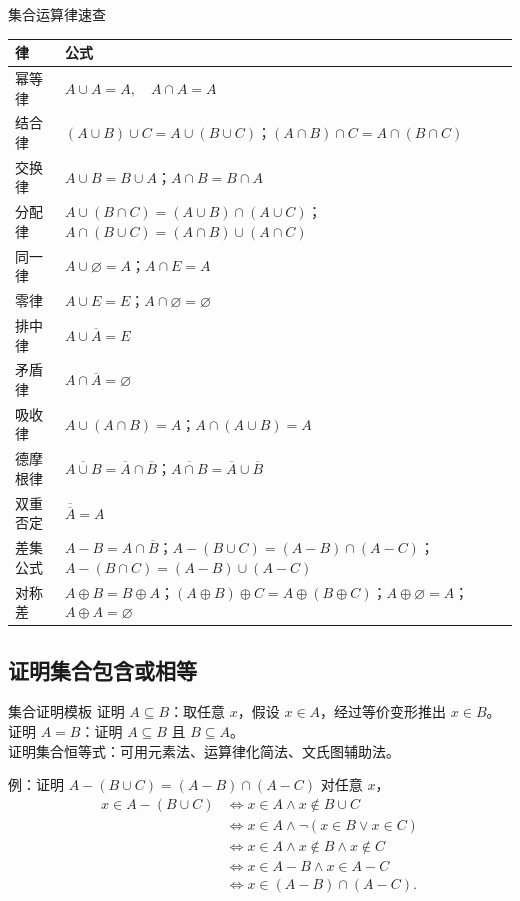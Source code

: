 \documentclass[UTF8,zihao=-4]{ctexart}
\begin{document}
\begin{corebox}{集合运算律速查}
\begin{longtable}{p{2.6cm}p{11cm}}
\toprule
律 & 公式 \\
\midrule
幂等律 & $A\cup A=A,\quad A\cap A=A$ \\
结合律 & $(A\cup B)\cup C=A\cup(B\cup C)$；$(A\cap B)\cap C=A\cap(B\cap C)$ \\
交换律 & $A\cup B=B\cup A$；$A\cap B=B\cap A$ \\
分配律 & $A\cup(B\cap C)=(A\cup B)\cap(A\cup C)$；$A\cap(B\cup C)=(A\cap B)\cup(A\cap C)$ \\
同一律 & $A\cup\varnothing=A$；$A\cap E=A$ \\
零律 & $A\cup E=E$；$A\cap\varnothing=\varnothing$ \\
排中律 & $A\cup\overline A=E$ \\
矛盾律 & $A\cap\overline A=\varnothing$ \\
吸收律 & $A\cup(A\cap B)=A$；$A\cap(A\cup B)=A$ \\
德摩根律 & $\overline{A\cup B}=\overline A\cap\overline B$；$\overline{A\cap B}=\overline A\cup\overline B$ \\
双重否定 & $\overline{\overline A}=A$ \\
差集公式 & $A-B=A\cap\overline B$；$A-(B\cup C)=(A-B)\cap(A-C)$；$A-(B\cap C)=(A-B)\cup(A-C)$ \\
对称差 & $A\oplus B=B\oplus A$；$(A\oplus B)\oplus C=A\oplus(B\oplus C)$；$A\oplus\varnothing=A$；$A\oplus A=\varnothing$ \\
\bottomrule
\end{longtable}
\end{corebox}

\subsection{证明集合包含或相等}

\begin{methodbox}{集合证明模板}
证明 $A\subseteq B$：取任意 $x$，假设 $x\in A$，经过等价变形推出 $x\in B$。\\
证明 $A=B$：证明 $A\subseteq B$ 且 $B\subseteq A$。\\
证明集合恒等式：可用元素法、运算律化简法、文氏图辅助法。
\end{methodbox}

\begin{exambox}{例：证明 $A-(B\cup C)=(A-B)\cap(A-C)$}
对任意 $x$，
\[
\begin{aligned}
x\in A-(B\cup C)
&\Leftrightarrow x\in A\land x\notin B\cup C\\
&\Leftrightarrow x\in A\land\neg(x\in B\lor x\in C)\\
&\Leftrightarrow x\in A\land x\notin B\land x\notin C\\
&\Leftrightarrow x\in A-B\land x\in A-C\\
&\Leftrightarrow x\in (A-B)\cap(A-C).
\end{aligned}
\]
\end{exambox}
\end{document}
